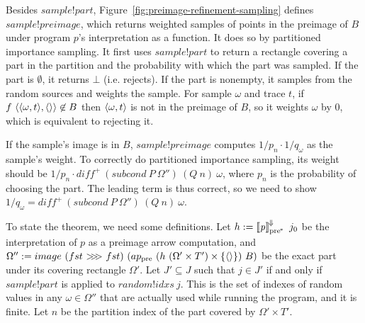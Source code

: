 Besides $sample!part$, Figure~\ref{fig:preimage-refinement-sampling} defines $sample!preimage$, which returns weighted samples of points in the preimage of $B$ under program $\mathit{p}$'s interpretation as a function.
It does so by partitioned importance sampling.
It first uses $sample!part$ to return a rectangle covering a part in the partition and the probability with which the part was sampled.
If the part is $\emptyset$, it returns $\bot$ (i.e. rejects).
If the part is nonempty, it samples from the random sources and weights the sample.
For sample $\omega$ and trace $t$, if $f~\langle{\langle{\omega,t}\rangle,\langle{}\rangle}\rangle \not\in B$ then $\langle{\omega,t}\rangle$ is not in the preimage of $B$, so it weights $\omega$ by $0$, which is equivalent to rejecting it.

If the sample's image is in $B$, $sample!preimage$ computes $1{/}p_n \cdot 1{/}q_\omega$ as the sample's weight.
To correctly do partitioned importance sampling, its weight should be $1{/}p_n \cdot diff^+~(subcond~P~\Omega'')~(Q~n)~\omega$, where $p_n$ is the probability of choosing the part.
The leading term is thus correct, so we need to show $1{/}q_\omega = diff^+~(subcond~P~\Omega'')~(Q~n)~\omega$.

To state the theorem, we need some definitions.
Let $h := \left\llbracket{\mathit{p}}\right\rrbracket^{\mspace{-2mu}\Downarrow\mspace{-2mu}}_\mathrm{pre^{\mspace{-2mu}*}}~j_0$ be the interpretation of $\mathit{p}$ as a preimage arrow computation, and $\Omega'' := image~(fst~{>}\mspace{-6mu}{>}\mspace{-6mu}{>}~fst)~(ap_\mathrm{pre}~(h~(\Omega' \times T') \times \{{\langle{}\rangle}\})~B)$ be the exact part under its covering rectangle $\Omega'$.
Let $J' \subseteq J$ such that $j \in J'$ if and only if $sample!part$ is applied to $random!idxs~j$.
This is the set of indexes of random values in any $\omega \in \Omega''$ that are actually used while running the program, and it is finite.
Let $n$ be the partition index of the part covered by $\Omega' \times T'$.

